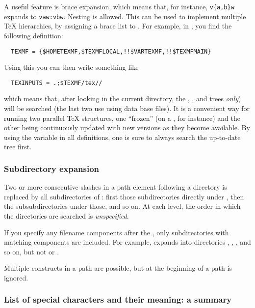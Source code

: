\documentclass{article}
\begin{document}
A useful feature is brace expansion, which means that, for instance,
\verb+v{a,b}w+ expands to \verb+vaw:vbw+. Nesting is allowed.
This can be used to implement multiple \TeX{} hierarchies, by
assigning a brace list to .
For example, in , you find 
the following definition:
\begin{verbatim}
  TEXMF = {$HOMETEXMF,$TEXMFLOCAL,!!$VARTEXMF,!!$TEXMFMAIN}
\end{verbatim}
Using this you can then write something like
\begin{verbatim}
  TEXINPUTS = .;$TEXMF/tex//
\end{verbatim}
which means that, after looking in the current directory, the
, , 
and  trees \emph{only}) will be searched (the
last two use using  data base files). It is a convenient
way for running two parallel \TeX{} structures, one ``frozen'' (on a
\CD, for instance) and the other being continuously updated with new
versions as they become available.  By using the 
variable in all definitions, one is sure to always search the
up-to-date tree first.

\subsubsection{Subdirectory expansion}
\label{Subdirectory-expansion}

Two or more consecutive slashes in a path element following a directory
 is replaced by all subdirectories of : first those
subdirectories directly under , then the subsubdirectories under
those, and so on.  At each level, the order in which the directories are
searched is \emph{unspecified}.

If you specify any filename components after the \samp{//}, only
subdirectories with matching components are included.  For example,
 expands into directories , ,
, and so on, but not  or .

Multiple \samp{//} constructs in a path are possible, but
\samp{//} at the beginning of a path is ignored.

\subsubsection{List of special characters and their meaning: a summary}
\end{document}
